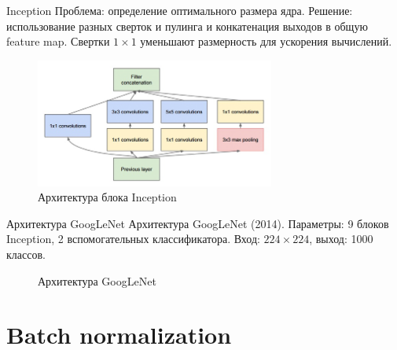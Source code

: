 \documentclass[11pt, intlimits]{beamer}
\begin{document}
\begin{frame}{Inception}
Проблема: определение оптимального размера ядра. Решение: использование разных сверток и пулинга и конкатенация выходов в общую feature map. Свертки $1 \times 1$ уменьшают размерность для ускорения вычислений.

\begin{figure}[h]
\includegraphics[width=0.7\textwidth]{inception_layer}
\caption{Архитектура блока Inception}
\label{img:inception_layer}
\end{figure}

\end{frame}


\begin{frame}{Архитектура GoogLeNet}
Архитектура GoogLeNet (2014). Параметры: 9 блоков Inception, 2 вспомогательных классификатора. Вход: $224 \times 224$, выход: 1000 классов.

\begin{figure}[h]
\caption{Архитектура GoogLeNet}
\label{img:googlenet}
\end{figure}

\end{frame}



\section{Batch normalization}
\end{document}
